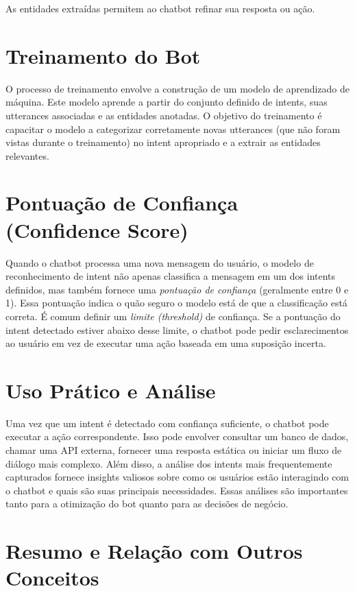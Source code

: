 \documentclass[14pt,a4paper,oneside]{book}
\begin{document}
As entidades extraídas permitem ao chatbot refinar sua resposta ou ação.

\section{Treinamento do Bot}
\label{sec:intents_treinamento}

O processo de treinamento envolve a construção de um modelo de aprendizado de máquina. Este modelo aprende a partir do conjunto definido de intents, suas utterances associadas e as entidades anotadas. O objetivo do treinamento é capacitar o modelo a categorizar corretamente novas utterances (que não foram vistas durante o treinamento) no intent apropriado e a extrair as entidades relevantes.

\section{Pontuação de Confiança (Confidence Score)}
\label{sec:intents_confianca}

Quando o chatbot processa uma nova mensagem do usuário, o modelo de reconhecimento de intent não apenas classifica a mensagem em um dos intents definidos, mas também fornece uma \textit{pontuação de confiança} (geralmente entre 0 e 1). Essa pontuação indica o quão seguro o modelo está de que a classificação está correta. É comum definir um \textit{limite (threshold)} de confiança. Se a pontuação do intent detectado estiver abaixo desse limite, o chatbot pode pedir esclarecimentos ao usuário em vez de executar uma ação baseada em uma suposição incerta.

\section{Uso Prático e Análise}
\label{sec:intents_uso_pratico}

Uma vez que um intent é detectado com confiança suficiente, o chatbot pode executar a ação correspondente. Isso pode envolver consultar um banco de dados, chamar uma API externa, fornecer uma resposta estática ou iniciar um fluxo de diálogo mais complexo. Além disso, a análise dos intents mais frequentemente capturados fornece insights valiosos sobre como os usuários estão interagindo com o chatbot e quais são suas principais necessidades. Essas análises são importantes tanto para a otimização do bot quanto para as decisões de negócio.

\section{Resumo e Relação com Outros Conceitos}
\label{sec:intents_resumo}
\end{document}

